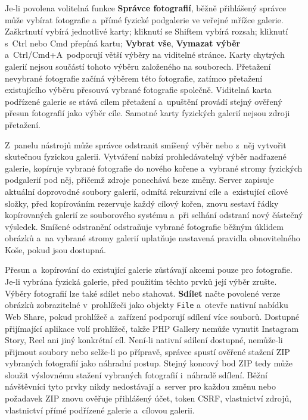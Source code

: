 \documentclass[11pt,a4paper]{article}
\newcommand{\ui}[1]{\textbf{#1}}
\newcommand{\codeword}[1]{\nolinkurl{#1}}
\begin{document}
Je-li povolena volitelná funkce \ui{Správce fotografií}, běžně přihlášený
správce může vybírat fotografie a~přímé fyzické podgalerie ve veřejné mřížce
galerie. Zaškrtnutí vybírá jednotlivé karty; kliknutí se Shiftem vybírá rozsah;
kliknutí s~Ctrl nebo Cmd přepíná kartu; \ui{Vybrat vše}, \ui{Vymazat výběr}
a~Ctrl/Cmd+A~podporují větší výběry na viditelné stránce. Karty chytrých galerií
nejsou součástí tohoto výběru založeného na souborech. Přetažení nevybrané
fotografie začíná výběrem této fotografie, zatímco přetažení existujícího výběru
přesouvá vybrané fotografie společně. Viditelná karta podřízené galerie se stává
cílem přetažení a~upuštění provádí stejný ověřený přesun fotografií jako výběr
cíle. Samotné karty fyzických galerií nejsou zdroji přetažení.

Z~panelu nástrojů může správce odstranit smíšený výběr nebo z~něj vytvořit
skutečnou fyzickou galerii. Vytváření nabízí prohledávatelný výběr nadřazené
galerie, kopíruje vybrané fotografie do nového kořene a~vybrané stromy fyzických
podgalerií pod něj, přičemž zdroje ponechává beze změny. Server zapisuje
aktuální doprovodné soubory galerií, odmítá rekurzivní cíle a~existující cílové
složky, před kopírováním rezervuje každý cílový kořen, znovu sestaví řádky
kopírovaných galerií ze souborového systému a~při selhání odstraní nový částečný
výsledek. Smíšené odstranění odstraňuje vybrané fotografie běžným úklidem
obrázků a~na vybrané stromy galerií uplatňuje nastavená pravidla obnovitelného
Koše, pokud jsou dostupná.

Přesun a~kopírování do existující galerie zůstávají akcemi pouze pro fotografie.
Je-li vybrána fyzická galerie, před použitím těchto prvků její výběr zrušte.
Výběry fotografií lze také sdílet nebo stahovat. \ui{Sdílet} načte povolené
verze obrázků zobrazitelné v~prohlížeči jako objekty \codeword{File} a~otevře
nativní nabídku Web Share, pokud prohlížeč a~zařízení podporují sdílení více
souborů. Dostupné přijímající aplikace volí prohlížeč, takže PHP Gallery nemůže
vynutit Instagram Story, Reel ani jiný konkrétní cíl. Není-li nativní sdílení
dostupné, nemůže-li přijmout soubory nebo selže-li po přípravě, správce spustí
ověřené stažení ZIP vybraných fotografií jako náhradní postup. Stejný koncový
bod ZIP tedy může sloužit výslovnému stažení vybraných fotografií i~náhradě
sdílení. Běžní návštěvníci tyto prvky nikdy nedostávají a~server pro každou
změnu nebo požadavek ZIP znovu ověřuje přihlášený účet, token CSRF, vlastnictví
zdrojů, vlastnictví přímé podřízené galerie a~cílovou galerii.
\end{document}
